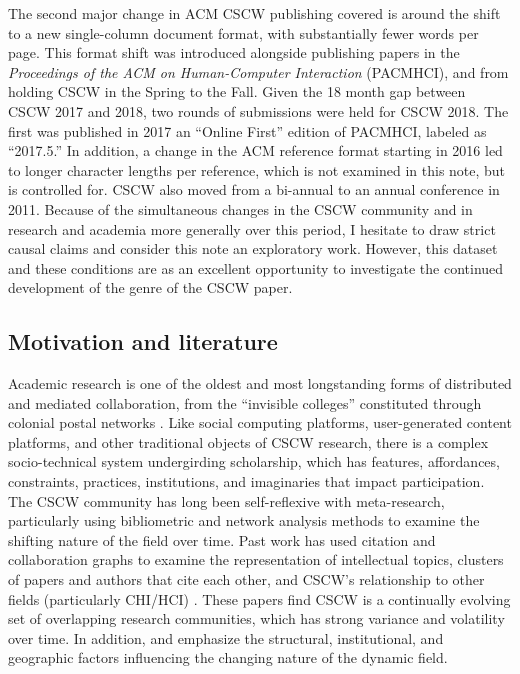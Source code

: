 \documentclass[format=acmsmall, screen=true]{acmart}
\begin{document}
The second major change in ACM CSCW publishing covered is around the shift to a new single-column document format, with substantially fewer words per page. This format shift was introduced alongside publishing papers in the \textit{Proceedings of the ACM on Human-Computer Interaction} (PACMHCI), and from holding CSCW in the Spring to the Fall. Given the 18 month gap between CSCW 2017 and 2018, two rounds of submissions were held for CSCW 2018. The first was published in 2017 an ``Online First'' edition of PACMHCI, labeled as ``2017.5.'' In addition, a change in the ACM reference format starting in 2016 led to longer character lengths per reference, which is not examined in this note, but is controlled for. CSCW also moved from a bi-annual to an annual conference in 2011. Because of the simultaneous changes in the CSCW community and in research and academia more generally over this period, I hesitate to draw strict causal claims and consider this note an exploratory work. However, this dataset and these conditions are as an excellent opportunity to investigate the continued development of the genre of the CSCW paper.

\subsection{Motivation and literature}
Academic research is one of the oldest and most longstanding forms of distributed and mediated collaboration, from the ``invisible colleges'' constituted through colonial postal networks \cite{shapin_leviathan_1985}. Like social computing platforms, user-generated content platforms, and other traditional objects of CSCW research, there is a complex socio-technical system undergirding scholarship, which has features, affordances, constraints, practices, institutions, and imaginaries that impact participation. The CSCW community has long been self-reflexive with meta-research, particularly using bibliometric and network analysis methods to examine the shifting nature of the field over time. Past work has used citation and collaboration graphs to examine the representation of intellectual topics, clusters of papers and authors that cite each other, and CSCW's relationship to other fields (particularly CHI/HCI) \cite{Wallace2017, Correia2018, Jacovi2006, Horn2004, Keegan2013}. These papers find CSCW is a continually evolving set of overlapping research communities, which has strong variance and volatility over time. In addition, \cite{Keegan2013} and \cite{correia2019effect} emphasize the structural, institutional, and geographic factors influencing the changing nature of the dynamic field. 
\end{document}
